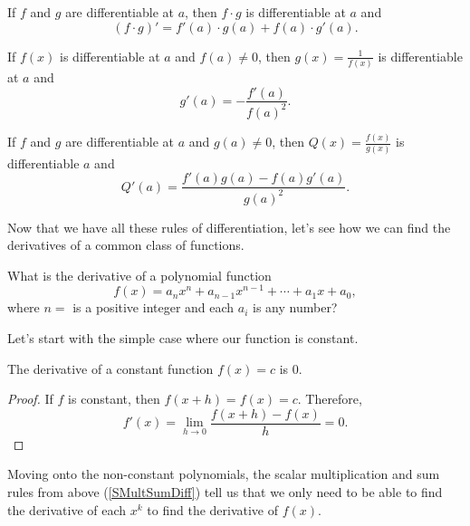 \begin{thm}
	If $f$ and $g$ are differentiable at $a$, then $f\cdot g$ is differentiable at $a$ and \begin{equation}
		(f\cdot g)'=f'(a)\cdot g(a)+f(a)\cdot g'(a).
	\end{equation}
\end{thm}

\begin{thm}
If $f(x)$ is differentiable at $a$ and $f(a)\neq 0$, then $g(x)=\frac{1}{f(x)}$ is differentiable at $a$ and
\begin{equation}
g'(a)=-\frac{f'(a)}{f(a)^2}.
\end{equation}
\end{thm}

\begin{cor}
	If $f$ and $g$ are differentiable at $a$ and $g(a)\neq 0$, then $Q(x)=\frac{f(x)}{g(x)}$ is differentiable $a$ and
	\begin{equation}
		Q'(a)=\frac{f'(a)g(a)-f(a)g'(a)}{g(a)^2}.
	\end{equation}
\end{cor}


Now that we have all these rules of differentiation, let's see how we can find the derivatives of a common class of functions.

\begin{quest}
	What is the derivative of a polynomial function
	\begin{equation}
		f(x)=a_nx^n+a_{n-1}x^{n-1}+\dotsb+ a_1x+a_0,
	\end{equation}
	where $n=$ is a positive integer and each $a_i$ is any number?
\end{quest}

Let's start with the simple case where our function is constant.

\begin{prop}
The derivative of a constant function $f(x) =c$ is 0.
\end{prop}

\begin{proof}
If $f$ is constant, then $f(x + h) = f(x) = c$. Therefore,
\[
f'(x) = \lim\limits_{h\to 0} \frac{f(x+h)-f(x)}{h} = 0.
\]
\end{proof}

Moving onto the non-constant polynomials, the scalar multiplication and sum rules from above (\cref{SMultSumDiff}) tell us that we only need to be able to find the derivative of each $x^k$ to find the derivative of $f(x)$.

